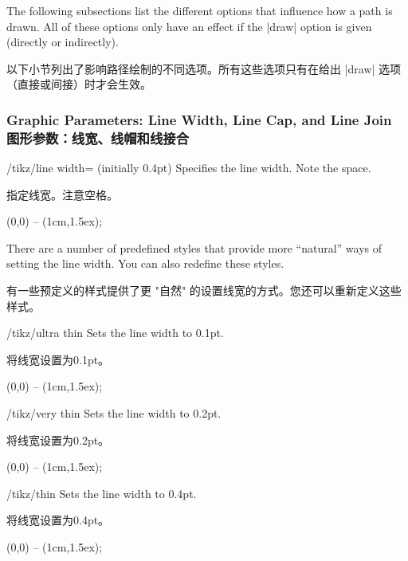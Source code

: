 The following subsections list the different options that influence how a path
is drawn. All of these options only have an effect if the |draw| option is
given (directly or indirectly).

以下小节列出了影响路径绘制的不同选项。所有这些选项只有在给出 |draw| 选项（直接或间接）时才会生效。


\subsubsection{Graphic Parameters: Line Width, Line Cap, and Line Join\\图形参数：线宽、线帽和线接合}
\label{section-cap-joins}

\begin{key}{/tikz/line width= (initially 0.4pt)}
    Specifies the line width. Note the space.
    
    
    指定线宽。注意空格。
%
\begin{codeexample}[]
  \tikz \draw[line width=5pt] (0,0) -- (1cm,1.5ex);
\end{codeexample}
\end{key}

There are a number of predefined styles that provide more ``natural'' ways of
setting the line width. You can also redefine these styles.

有一些预定义的样式提供了更 "自然" 的设置线宽的方式。您还可以重新定义这些样式。

\begin{stylekey}{/tikz/ultra thin}
    Sets the line width to 0.1pt.

    将线宽设置为0.1pt。

\begin{codeexample}[]
  \tikz {} (0,0) -- (1cm,1.5ex);
\end{codeexample}
\end{stylekey}

\begin{stylekey}{/tikz/very thin}
    Sets the line width to 0.2pt.

    将线宽设置为0.2pt。

\begin{codeexample}[]
  \tikz {} (0,0) -- (1cm,1.5ex);
\end{codeexample}
\end{stylekey}

\begin{stylekey}{/tikz/thin}
    Sets the line width to 0.4pt.

    将线宽设置为0.4pt。

\begin{codeexample}[]
  \tikz \draw[thin] (0,0) -- (1cm,1.5ex);
\end{codeexample}
\end{stylekey}

